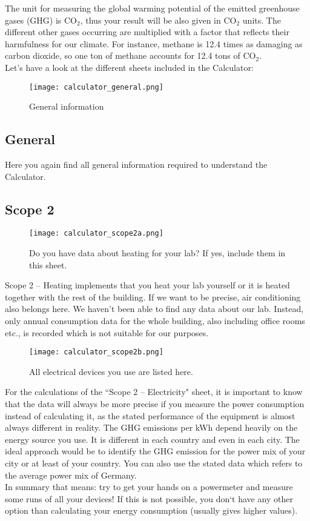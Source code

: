 The unit for measuring the global warming potential of the emitted greenhouse gases (GHG) is CO$_2$, thus your result will be also given in CO$_2$ units. The different other gases occurring are multiplied with a factor that reflects their harmfulness for our climate. For instance, methane is 12.4 times as damaging as carbon dioxide, so one ton of methane accounts for 12.4 tons of CO$_2$. \\
Let’s have a look at the different sheets included in the Calculator:

\begin{wrapfigure}{r}{8cm}
	\centering
	\texttt{[image: calculator\_general.png]}%
	\caption{General information}%
\end{wrapfigure}

\subsection{General}

Here you again find all general information required to understand the Calculator. 

\subsection{Scope 2}
\begin{wrapfigure}{r}{8cm}
	\centering
	\texttt{[image: calculator\_scope2a.png]}%
	\caption{Do you have data about heating for your lab? If yes, include them in this sheet.}%
\end{wrapfigure}

Scope 2 – Heating implements that you heat your lab yourself or it is heated together with the rest of the building. If we want to be precise, air conditioning also belongs here. We haven’t been able to find any data about our lab. Instead, only annual consumption data for the whole building, also including office rooms etc., is recorded which is not suitable for our purposes.
\begin{wrapfigure}{r}{8cm}
	\centering
	\texttt{[image: calculator\_scope2b.png]}%
	\caption{All electrical devices you use are listed here.}%
\end{wrapfigure}


For the calculations of the “Scope 2 – Electricity" sheet, it is important to know that the data will always be more precise if you measure the power consumption instead of calculating it, as the stated performance of the equipment is almost always different in reality. The GHG emissions per kWh depend heavily on the energy source you use. It is different in each country and even in each city. The ideal approach would be to identify the GHG emission for the power mix of your city or at least of your country. You can also use the stated data which refers to the average power mix of Germany.\\
In summary that means: try to get your hands on a powermeter and measure some runs of all your devices! If this is not possible, you don`t have any other option than calculating your energy consumption (usually gives higher values). 

